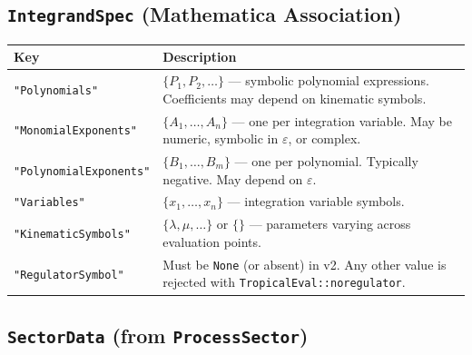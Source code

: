 \documentclass[11pt,a4paper]{article}
\begin{document}
\subsection{\texttt{IntegrandSpec} (Mathematica Association)}

\begin{center}
\begin{tabular}{lp{9cm}}
\toprule
\textbf{Key} & \textbf{Description} \\
\midrule
\texttt{"Polynomials"} & $\{P_1, P_2, \ldots\}$ --- symbolic polynomial expressions. Coefficients may depend on kinematic symbols. \\
\texttt{"MonomialExponents"} & $\{A_1, \ldots, A_n\}$ --- one per integration variable. May be numeric, symbolic in $\varepsilon$, or complex. \\
\texttt{"PolynomialExponents"} & $\{B_1, \ldots, B_m\}$ --- one per polynomial. Typically negative. May depend on $\varepsilon$. \\
\texttt{"Variables"} & $\{x_1, \ldots, x_n\}$ --- integration variable symbols. \\
\texttt{"KinematicSymbols"} & $\{\lambda, \mu, \ldots\}$ or $\{\}$ --- parameters varying across evaluation points. \\
\texttt{"RegulatorSymbol"} & Must be \texttt{None} (or absent) in v2. Any other value is rejected with \texttt{TropicalEval::noregulator}. \\
\bottomrule
\end{tabular}
\end{center}

\subsection{\texttt{SectorData} (from \texttt{ProcessSector})}\label{sec:sectordata}
\end{document}
